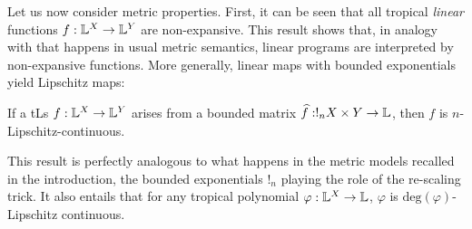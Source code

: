 \documentclass[submission,%
]{eptcs}
\begin{document}
%

Let us now consider metric properties. First, it can be seen that all tropical \emph{linear} functions $f: \mathbb{L}^{X}\to \mathbb{L}^{Y}$ are non-expansive. 
This result shows that, in analogy with that happens in usual metric semantics, linear programs are interpreted by non-expansive functions. 
More generally, linear maps with bounded exponentials yield Lipschitz maps:
\begin{proposition}\label{prop:boundedlip}
If a tLs $f: \mathbb{L}^{X}\to \mathbb{L}^{Y}$ arises from a bounded matrix $\widehat{f}:!_{n}X\times Y\to \mathbb{L}$, then $f$ is $n$-Lipschitz-continuous.
\end{proposition}
This result is perfectly analogous to what happens in the metric models recalled in the introduction, the bounded exponentials $!_{n}$ playing the role of the re-scaling trick.
It also entails that for any tropical polynomial $\varphi:\mathbb{L}^{X}\to\mathbb{L}$, $\varphi$ is $\mathrm{deg}(\varphi)$-Lipschitz continuous.
\end{document}
